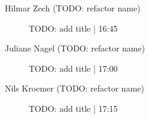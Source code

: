 \begin{symposium}
\begin{description}
                \item [Hilmar Zech (TODO: refactor name)] TODO: add title \textcolor{mygray}{ | 16:45}    
                
                \item [Juliane Nagel (TODO: refactor name)] TODO: add title \textcolor{mygray}{ | 17:00}    
                
                \item [Nils Kroemer (TODO: refactor name)] TODO: add title \textcolor{mygray}{ | 17:15}    
                
            \end{description} 
            \end{symposium}
            